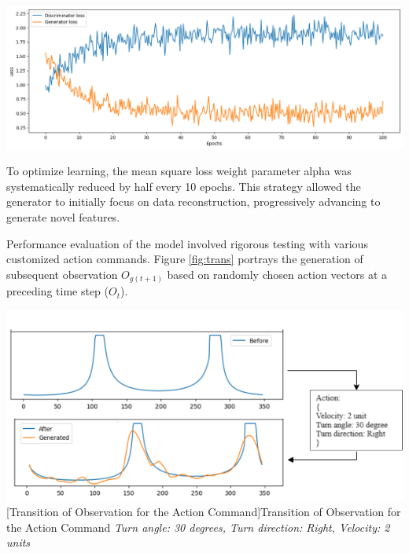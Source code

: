 \documentclass[12pt,twoside,a4paper,parskip]{scrbook} %
\begin{document}
\begin{minipage}[t]{\linewidth}
        \centering
        \includegraphics[width=1\textwidth]{Images/loss.png}
        \label{fig:loss}
        \vspace{-\baselineskip} %
    \end{minipage}
    \hfill

To optimize learning, the mean square loss weight parameter alpha was systematically reduced by half every 10 epochs. This strategy allowed the generator to initially focus on data reconstruction, progressively advancing to generate novel features.

Performance evaluation of the model involved rigorous testing with various customized action commands. Figure \ref{fig:trans} portrays the generation of subsequent observation $O_{g(t+1)}$ based on randomly chosen action vectors at a preceding time step ($O_{t}$).

\begin{minipage}[t]{\linewidth}
        \centering
        \includegraphics[width=1\textwidth]{Images/act_trans.png}
        [Transition of Observation for the Action Command]{Transition of Observation for the Action Command \textit{{Turn angle: 30 degrees, Turn direction: Right, Velocity: 2 units}}}
        \label{fig:trans}
        \vspace{-\baselineskip} %
    \end{minipage}
    \hfill
\end{document}

